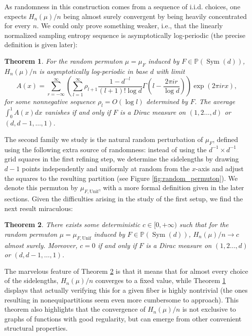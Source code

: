 \documentclass[11pt]{article}
\newcommand{\Sym}{\mathop{\mathrm{Sym}}}
\newcommand{\PP}{\mathbb{P}}
\newcommand{\Unif}{\mathrm{Unif}}
\newtheorem{theorem}{Theorem}[section]
\theoremstyle{definition}
\begin{document}
As randomness in this construction comes from a sequence of i.i.d. choices, one expects $H_n(\mu)/n$ being almost surely convergent by being heavily concentrated for every $n$. We could only prove something weaker, i.e., that the linearly normalized sampling entropy sequence is asymptotically log-periodic (the precise definition is given later):

\begin{theorem}\label{thm:random_automorphism}
    For the random permuton $\mu=\mu_F$ induced by $F\in \PP(\Sym(d))$, $H_n(\mu)/n$ is asymptotically log-periodic in base $d$ with limit
    \begin{equation} \label{eq:aut_thm_statement}
    A(x)=\sum_{r=-\infty}^{\infty}\left(\sum_{l=1}^{\infty}\rho_{l+1}\frac{1-d^{-l}}{(l+1)! \log d}\Gamma\left(l-\frac{2\pi i r}{\log d}\right)\right)\exp (2\pi i r x),
    \end{equation}
    for some nonnegative sequence $\rho_l=O(\log l)$ determined by $F$. The average $\int_{0}^{1}A(x)dx$ vanishes if and only if
    $F$ is a Dirac measure on $(1,2\dots ,d)$ or $(d,d-1,\dots ,1)$. 
\end{theorem}

The second family we study is the natural random perturbation of $\mu_F$, defined using the following extra source of randomness: instead of using the $d^{-1}\times d^{-1}$ grid squares in the first refining step, we determine the sidelengths by drawing $d-1$ points independently and uniformly at random from the $x$-axis and adjust the squares to the resulting partition (see Figure \ref{fig:random_permuton}). We denote this permuton by $\mu_{F, \Unif}$, with a more formal definition given in the later sections. Given the difficulties arising in the study of the first setup, we find the next result miraculous:

\begin{theorem}\label{thm:random_automorphism2}
    There exists some deterministic $c\in [0, +\infty)$ such that for the random permuton $\mu=\mu_{F, \Unif}$ induced by $F\in \PP(\Sym(d))$, $H_n(\mu)/n\to c$ almost surely. Moreover, $c=0$ if and only if $F$ is a Dirac measure on $(1,2\dots ,d)$ or $(d,d-1,\dots ,1)$.
\end{theorem}

The marvelous feature of Theorem \ref{thm:random_automorphism2} is that it means that for almost every choice of the sidelengths, $H_n(\mu)/n$ converges to a fixed value, while Theorem \ref{thm:random_automorphism} displays that 
actually verifying this for a given fiber is highly nontrivial (the ones resulting in nonequipartitions seem even more cumbersome to approach). This theorem also highlights that the convergence of $H_n(\mu)/n$ is not exclusive to graphs of functions with good regularity, but can emerge from other convenient structural properties.
\end{document}
